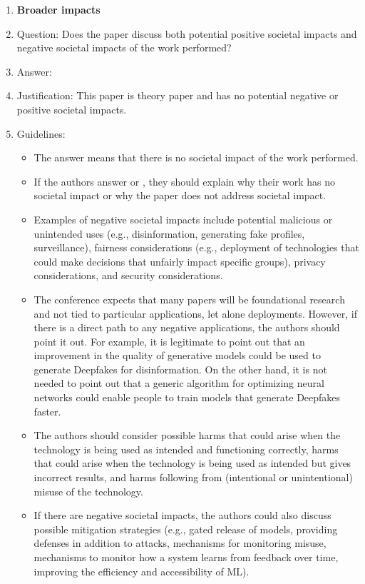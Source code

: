 \documentclass{article}
\theoremstyle{definition}
\theoremstyle{remark}
\begin{document}
\begin{enumerate}
\item {\bf Broader impacts}
    \item[] Question: Does the paper discuss both potential positive societal impacts and negative societal impacts of the work performed?
    \item[] Answer: \answerNA{} %
    \item[] Justification: This paper is theory paper and has no potential negative or positive societal impacts. 
    \item[] Guidelines:
    \begin{itemize}
        \item The answer \answerNA{} means that there is no societal impact of the work performed.
        \item If the authors answer \answerNA{} or \answerNo, they should explain why their work has no societal impact or why the paper does not address societal impact.
        \item Examples of negative societal impacts include potential malicious or unintended uses (e.g., disinformation, generating fake profiles, surveillance), fairness considerations (e.g., deployment of technologies that could make decisions that unfairly impact specific groups), privacy considerations, and security considerations.
        \item The conference expects that many papers will be foundational research and not tied to particular applications, let alone deployments. However, if there is a direct path to any negative applications, the authors should point it out. For example, it is legitimate to point out that an improvement in the quality of generative models could be used to generate Deepfakes for disinformation. On the other hand, it is not needed to point out that a generic algorithm for optimizing neural networks could enable people to train models that generate Deepfakes faster.
        \item The authors should consider possible harms that could arise when the technology is being used as intended and functioning correctly, harms that could arise when the technology is being used as intended but gives incorrect results, and harms following from (intentional or unintentional) misuse of the technology.
        \item If there are negative societal impacts, the authors could also discuss possible mitigation strategies (e.g., gated release of models, providing defenses in addition to attacks, mechanisms for monitoring misuse, mechanisms to monitor how a system learns from feedback over time, improving the efficiency and accessibility of ML).
    \end{itemize}
    

\end{enumerate}
\end{document}
